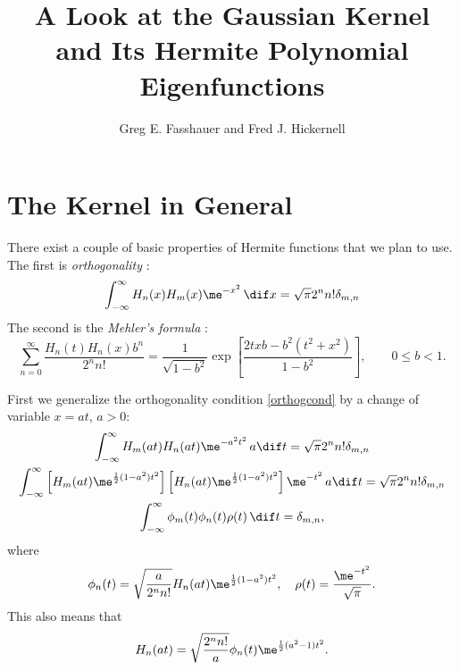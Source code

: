 \documentclass[]{elsarticle}
\theoremstyle{definition}
\begin{document}
\begin{frontmatter}

\title{A Look at the Gaussian Kernel and Its Hermite Polynomial Eigenfunctions}
\author{Greg E. Fasshauer and Fred J. Hickernell}
\address{Room E1-208, Department of Applied Mathematics, Illinois Institute of Technology,\\ 10 W.\ 32$^{\text{nd}}$ St., Chicago, IL 60616}
\begin{abstract}
\end{abstract}

\begin{keyword}


\end{keyword}
\end{frontmatter}

\section{The Kernel in General}
There exist a couple of basic properties of Hermite functions that we plan to use.  The first is {\em orthogonality} \citep[Sect.\ 18.2-3]{OlvEtal10a}:
\begin{equation} \label{orthogcond}
\int_{-\infty}^{\infty} H_n(x) H_m(x) \me^{-x^2} \, \dif x  = \sqrt{\pi} 2^n n! \delta_{m,n}
\end{equation}
The second is the {\em Mehler's formula} \citep[Eq.\ 18.18.28]{OlvEtal10a}:
\begin{equation} \label{Poissonkern}
\sum_{n=0}^{\infty} \frac{H_n(t) H_n(x) b^n}{2^n n!} = \frac1{\sqrt{1-b^2}} \exp\left[\frac{2txb -b^2(t^2+x^2)}{1-b^2}\right], \qquad 0 \le b < 1.
\end{equation}

First we generalize the orthogonality condition \eqref{orthogcond} by a change of variable $x=at$, $a>0$:
\begin{gather*}
\int_{-\infty}^{\infty} H_m(at) H_n(at) \me^{-a^2t^2} \, a\dif t  = \sqrt{\pi} 2^n n! \delta_{m,n} \\
\int_{-\infty}^{\infty} \left[H_m(at) \me^{\frac 12 (1-a^2)t^2} \right] \left[ H_n(at) \me^{\frac 12 (1-a^2)t^2} \right]  \me^{-t^2} \, a\dif t  = \sqrt{\pi} 2^n n! \delta_{m,n} \\
\int_{-\infty}^{\infty} \phi_m(t) \phi_n(t) \rho(t)  \, \dif t  = \delta_{m,n},
\end{gather*}
where
\[
\phi_n(t) = \sqrt{\frac{a}{2^n n!}} H_n(at) \me^{\frac 12 (1-a^2)t^2}, \quad \rho(t) = \frac{\me^{-t^2}}{\sqrt{\pi}} .
\]
This also means that
\[
H_n(at) = \sqrt{\frac{2^n n!}{a}} \phi_n(t)  \me^{\frac 12 (a^2-1)t^2}.
\]
\end{document}
